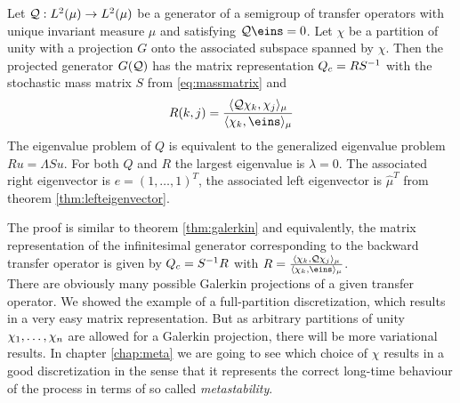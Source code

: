 \begin{thm}
Let $\mathcal{Q}: L^2(\mu) \rightarrow L^2(\mu)$ be a generator of a semigroup of transfer operators with unique invariant measure $\mu$ and satisfying $\Qcal\eins = 0$.
Let $\chi$ be a partition of unity with a projection $G$ onto the associated subspace spanned by $\chi$.
Then the projected generator $G(\mathcal{Q})$ has the matrix representation $Q_c = RS^{-1}$ with the stochastic mass matrix $S$ from \eqref{eq:massmatrix} and
\begin{equation*}
R(k,j) = \frac{\langle \Qcal\chi_k, \chi_j \rangle_\mu}{\langle \chi_k, \eins \rangle_\mu}
\end{equation*}
The eigenvalue problem of $Q$ is equivalent to the generalized eigenvalue problem $Ru = \Lambda Su$.
For both $Q$ and $R$ the largest eigenvalue is $\lambda = 0$. The associated right eigenvector is $e=(1,\dots,1)^T$, the associated left eigenvector is $\hat{\mu}^T$ from theorem \ref{thm:lefteigenvector}.
\end{thm}
The proof is similar to theorem \ref{thm:galerkin} and equivalently, the matrix representation of the infinitesimal generator corresponding to the backward transfer operator is given by $Q_c = S^{-1} R$ with $R = \frac{\langle \chi_k, \Qcal \chi_j \rangle_\mu}{\langle \chi_k, \eins \rangle_\mu}$.
\\

There are obviously many possible Galerkin projections of a given transfer operator. We showed the example of a full-partition discretization, which results in a very easy matrix representation. But as arbitrary partitions of unity $\chi_1,\dots,\chi_n$ are allowed for a Galerkin projection, there will be more variational results.
In chapter \ref{chap:meta} we are going to see which choice of $\chi$ results in a good discretization in the sense that it represents the correct long-time behaviour of the process in terms of so called \textit{metastability}.
